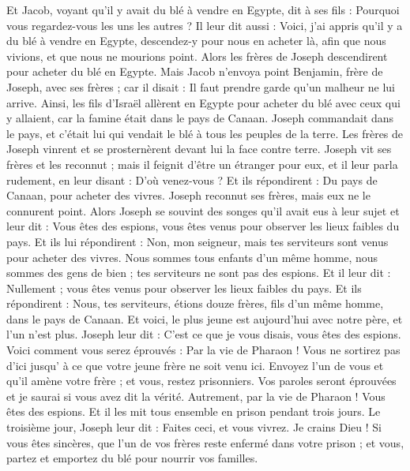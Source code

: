 \begin{multicols}{2}
\VerseOne{}Et Jacob, voyant qu'il y avait du blé à vendre en Egypte, dit à ses fils : Pourquoi vous regardez-vous les uns les autres ?
Il leur dit aussi : Voici, j'ai appris qu'il y a du blé à vendre en Egypte, descendez-y pour nous en acheter là, afin que nous vivions, et que nous ne mourions point.
Alors les frères de Joseph descendirent pour acheter du blé en Egypte.
Mais Jacob n'envoya point Benjamin, frère de Joseph, avec ses frères ; car il disait : Il faut prendre garde qu'un malheur ne lui arrive.
Ainsi, les fils d'Israël allèrent en Egypte pour acheter du blé avec ceux qui y allaient, car la famine était dans le pays de Canaan.
Joseph commandait dans le pays, et c'était lui qui vendait le blé à tous les peuples de la terre. Les frères de Joseph vinrent et se prosternèrent devant lui la face contre terre.
Joseph vit ses frères et les reconnut ; mais il feignit d'être un étranger pour eux, et il leur parla rudement, en leur disant : D'où venez-vous ? Et ils répondirent : Du pays de Canaan, pour acheter des vivres.
Joseph reconnut ses frères, mais eux ne le connurent point.
Alors Joseph se souvint des songes qu'il avait eus à leur sujet et leur dit : Vous êtes des espions, vous êtes venus pour observer les lieux faibles du pays.
Et ils lui répondirent : Non, mon seigneur, mais tes serviteurs sont venus pour acheter des vivres.
Nous sommes tous enfants d'un même homme, nous sommes des gens de bien ; tes serviteurs ne sont pas des espions.
Et il leur dit : Nullement ; vous êtes venus pour observer les lieux faibles du pays.
Et ils répondirent : Nous, tes serviteurs, étions douze frères, fils d'un même homme, dans le pays de Canaan. Et voici, le plus jeune est aujourd'hui avec notre père, et l'un n'est plus.
Joseph leur dit : C'est ce que je vous disais, vous êtes des espions.
Voici comment vous serez éprouvés : Par la vie de Pharaon ! Vous ne sortirez pas d'ici jusqu' à ce que votre jeune frère ne soit venu ici.
Envoyez l'un de vous et qu'il amène votre frère ; et vous, restez prisonniers. Vos paroles seront éprouvées et je saurai si vous avez dit la vérité. Autrement, par la vie de Pharaon ! Vous êtes des espions.
Et il les mit tous ensemble en prison pendant trois jours.
Le troisième jour, Joseph leur dit : Faites ceci, et vous vivrez. Je crains Dieu !
Si vous êtes sincères, que l'un de vos frères reste enfermé dans votre prison ; et vous, partez et emportez du blé pour nourrir vos familles.

\end{multicols}
